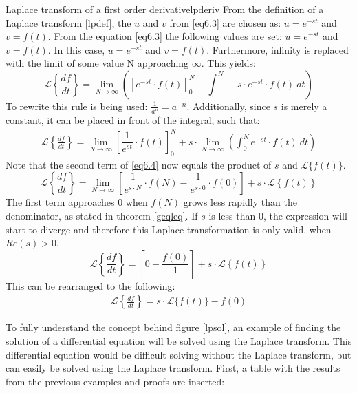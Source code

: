 \begin{prof}{Laplace transform of a first order derivative}{lpderiv}
From the definition of a Laplace transform \ref{lpdef}, the $u$ and $v$ from \ref{eq6.3} are chosen as: $u=e^{-st}$ and $v=f(t)$.
From the equation \ref{eq6.3} the following values are set: $u=e^{-st}$ and $v=f(t)$.
In this case, $u=e^{-st}$ and $v=f(t)$. Furthermore, infinity is replaced with the limit of some value N approaching $\infty$. This yields:
$$\mathcal{L} \left\{\frac{df}{dt} \right\}=\lim_{N \to \infty} \left(\left[e^{-st}\cdot f(t)\right]_{0}^{N}-\int_{0}^{N} -s\cdot e^{-st}\cdot f(t)\ dt \right)$$
To rewrite this rule is being used: $\frac{1}{a^n}=a^{-n}$. Additionally, since $s$ is merely a constant, it can be placed in front of the integral, such that:
\begin{align}
\mathcal{L} \left\{\frac{df}{dt} \right\}=\lim_{N \to \infty} \left[\dfrac{1}{e^{st}}\cdot f(t)\right]_{0}^{N}+ s \cdot \lim_{N \to \infty} \left( \int_{0}^{N}e^{-st}\cdot f(t)\ dt \right)
\end{align} \label{eq6.4}
Note that the second term of \eqref{eq6.4} now equals the product of $s$ and $\mathcal{L}\{f(t)\}$.
$$\mathcal{L} \left\{\frac{df}{dt} \right\} = \lim_{N \to \infty}\left[\dfrac{1}{e^{s\cdot N}}\cdot f(N)-\dfrac{1}{e^{s\cdot 0}}\cdot f(0)\right]+s\cdot \mathcal{L} \left\{f(t) \right\}$$
The first term approaches 0 when $f(N)$ grows less rapidly than the denominator, as stated in theorem \ref{geqleq}. If $s$ is less than 0, the expression will start to diverge and therefore this Laplace transformation is only valid, when $Re(s)>0$.
$$\mathcal{L} \left\{\frac{df}{dt} \right\} = \left[0-\dfrac{f(0)}{1}\right]+s\cdot \mathcal{L} \left\{f(t) \right\}$$
This can be rearranged to the following:
\begin{align*}
\mathcal{L} \left\{\frac{df}{dt} \right\} = s\cdot \mathcal{L}\{f(t)\}-f(0)
\end{align*}

\end{prof}
To fully understand the concept behind figure \ref{lpsol}, an example of finding the solution of a differential equation will be solved using the Laplace transform. This differential equation would be difficult solving without the Laplace transform, but can easily be solved using the Laplace transform. First, a table with the results from the previous examples and proofs are inserted:

